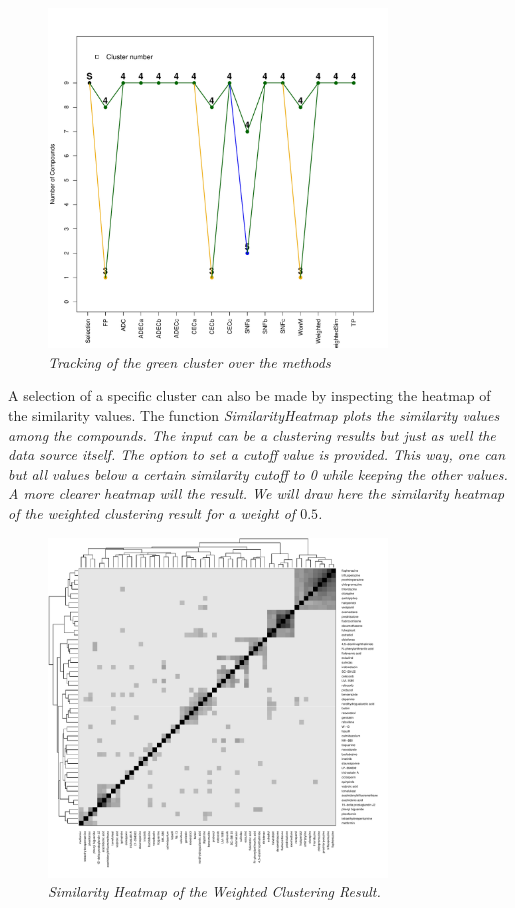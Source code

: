 \documentclass[a4paper]{article}
\begin{document}
\vspace{-1.0cm}
\begin{figure}[H]
\centering
\includegraphics[width=9cm,height=9cm]{Tracking.pdf}
\caption{{\it Tracking of the green cluster over the
methods}\label{MCF7_Track}}
\end{figure}
\noindent A selection of a specific cluster can also be made by inspecting the
heatmap of the similarity values. The function \it{SimilarityHeatmap} plots the
similarity values among the compounds. The input can be a clustering results but
just as well the data source itself. The option to set a cutoff value is
provided. This way, one can but all values below a certain similarity cutoff to
0 while keeping the other values. A more clearer heatmap will the result.
We will draw here the similarity heatmap of the weighted clustering result for
a weight of $0.5$.
\begin{Schunk}
\end{Schunk}
\vspace{-1.0cm}
\begin{figure}[H]
\centering
\includegraphics[width=9cm,height=9cm]{SimilarityHeatmap_MCF7W.pdf}
\caption{{\it Similarity Heatmap of the Weighted
Clustering Result.}\label{SimMap}}
\end{figure}
\end{document}
